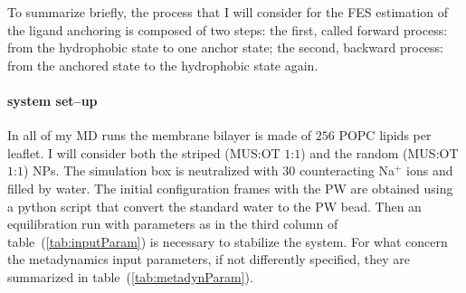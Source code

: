 To summarize briefly, the process that I will consider for the \ac{FES} estimation of the ligand anchoring is composed of two steps: the first, called forward process: from the hydrophobic state to one anchor state; the second, backward process: from the anchored state to the hydrophobic state again. 

\paragraph{\textbf{system set--up}} In all of my \ac{MD} runs the membrane bilayer is made of $256$ \ac{POPC} lipids per leaflet. I will consider both the striped (\ac{MUS}:\ac{OT} $1$:$1$) and the random (\ac{MUS}:\ac{OT} $1$:$1$) \acp{NP}. The simulation box is neutralized with $30$ counteracting Na$^+$ ions and filled by water. The initial configuration frames with the \ac{PW} are obtained using a python script that convert the standard \martini water to the \ac{PW} bead. Then an equilibration run with parameters as in the third column of table~(\ref{tab:inputParam}) is necessary to stabilize the system. For what concern the metadynamics input parameters, if not differently specified, they are summarized in table~(\ref{tab:metadynParam}).


